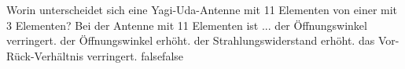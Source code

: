     {Worin unterscheidet sich eine Yagi-Uda-Antenne mit 11 Elementen von einer mit 3 Elementen? Bei der Antenne mit 11 Elementen ist ...}
    {der Öffnungswinkel verringert.}
    {der Öffnungswinkel erhöht.}
    {der Strahlungswiderstand erhöht.}
    {das Vor-Rück-Verhältnis verringert.}
    {false}{false}